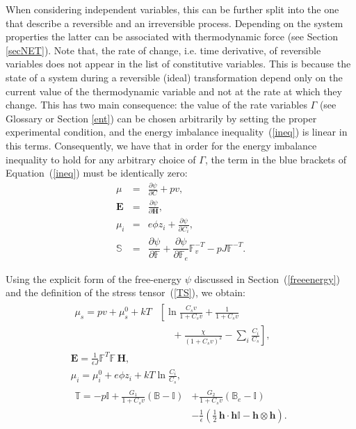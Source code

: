 \documentclass[runningheads]{llncs}
\newcommand{\F}{\ensuremath{\mathbb{F}}}
\begin{document}
When considering independent variables, this can be further split into the one that describe a reversible and an irreversible process. Depending on the system properties the latter can be associated with thermodynamic force (see Section \ref{secNET}). Note that, the rate of change, i.e. time derivative, of reversible variables does not appear in the list of constitutive variables. This is because the state of a system during a reversible (ideal) transformation depend only on the current value of the thermodynamic variable and not at the rate at which they change\cite{NET}.
This has two main consequence: the value of the rate variables $\Gamma$ (see Glossary or Section \ref{ent}) can be chosen arbitrarily by setting the proper experimental condition, and the energy imbalance inequality~(\ref{ineq}) is linear in this terms. Consequently, we have that in order for the energy imbalance inequality to hold for any arbitrary choice of $\Gamma$, the term in the blue brackets of Equation~(\ref{ineq}) must be identically zero: 
\begin{eqnarray}
\mu &=& \frac{\partial \psi}{\partial C}+ p v,\\[2mm]
\mathbf{E} &=& \frac{\partial \psi}{\partial \mathbf{H}},\\[2mm]
\mu_i &=& e\phi z_i + \frac{\partial \psi}{\partial C_i},\\[2mm]
\mathbb{S} &=&  \dfrac{\partial \psi}{\partial \F} + \dfrac{\partial \psi}{\partial \F_e}\F_v^{-T}- p J \F^{-T}.
\end{eqnarray}

Using the explicit form of the free-energy $\psi$ discussed in Section~(\ref{freeenergy}) and the definition of the stress tensor~(\ref{TS}), we obtain:
\begin{gather}
\begin{aligned}
\mu_s = p v + \mu_s^0+ kT&\left[\ln \frac{C_s v}{1+C_s v} + \frac{1}{1+C_sv}\right.
\\&\left.\ \ \ \ \ \ +\frac{\chi}{(1+C_s v)^2}-\sum_i \frac{C_i}{C_s}\right], 
\end{aligned}\label{temp8}\\
\mathbf{E} = \frac{1}{\epsilon J} \F^T \F\, \mathbf{H},\label{temp6}\\[2mm]
\mu_i = \mu^0_i + e\phi z_i + kT \ln \frac{C_i}{ C_s},\\[2mm]
\begin{aligned}
\mathbb{T}= -p \mathbb{I} + \frac{G_1}{1+C_sv}\left(\mathbb{B}-\mathbb{I}\right) &+ \frac{G_2}{1+C_sv}\left(\mathbb{B}_e-\mathbb{I}\right)\\ &- \frac{1}{\epsilon} \left(\frac{1}{2} \,\mathbf{h}\cdot  \mathbf{h} \mathbb{I} -\mathbf{h} \otimes \mathbf{h}\right).\label{temp7}
\end{aligned}
\end{gather}
\end{document}
